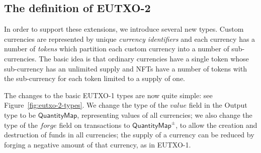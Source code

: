 \documentclass[a4paper]{article}
\newcommand{\s}{\textsf}  %
\newcommand{\mi}[1]{\ensuremath{\mathit{#1}}}
\newcommand{\forge}{\mi{forge}}
\newcommand{\val}{\mi{value}}  %
\newcommand{\qtymap}{\ensuremath{\s{QuantityMap}}}
\newcommand{\qtymappm}{\ensuremath{\s{QuantityMap}^{\pm}}}
\begin{document}
\subsection{The definition of EUTXO-2}
In order to support these extensions, we introduce several new types.
Custom currencies are represented by unique \textit{currency
  identifiers} and each currency has a number of \textit{tokens} which
partition each custom currency into a number of sub-currencies.  The
basic idea is that ordinary currencies have a single token whose
sub-currency has an unlimited supply and NFTs have a number of tokens
with the sub-currency for each token limited to a supply of one.

The changes to the basic EUTXO-1 types are now quite simple:
see Figure~\ref{fig:eutxo-2-types}.  We change the type of the $\val$ field
in the \s{Output} type to be \qtymap{}, representing values of all currencies;
we also change the type of the \forge{} field on transactions to \qtymappm{}, to
allow the creation and destruction of funds in all currencies; the
supply of a currency can be reduced by forging a negative amount of that
currency, as in EUTXO-1.
\end{document}
